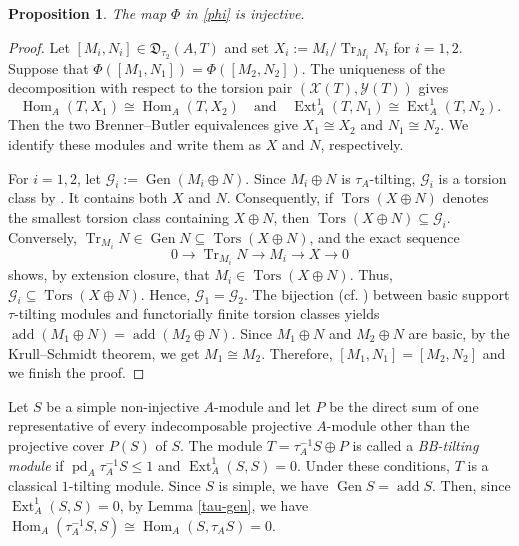 \documentclass[reqno,12pt]{amsart}
\numberwithin{equation}{section}
\theoremstyle{plain}
\newtheorem{proposition}[theorem]{\bf Proposition}
\theoremstyle{definition}
\begin{document}
\begin{proposition}\label{phi-injective}
The map $\Phi$ in \eqref{phi} is injective.
\end{proposition}
\begin{proof}
Let $[M_i,N_i]\in\mathfrak D_{\tau_2}(A,T)$ and set
$X_i:=M_i/\operatorname{Tr}_{M_i}N_i$ for $i=1,2$. Suppose that $\Phi([M_1,N_1])=\Phi([M_2,N_2])$. The uniqueness of the
decomposition with respect to the torsion pair
$(\mathcal X(T),\mathcal Y(T))$ gives
\[
\operatorname{Hom}_A(T,X_1)\cong\operatorname{Hom}_A(T,X_2)
\quad\text{and}\quad
\operatorname{Ext}_A^1(T,N_1)\cong\operatorname{Ext}_A^1(T,N_2).
\]
Then the two Brenner--Butler equivalences give
$X_1\cong X_2$ and $N_1\cong N_2$. We identify these modules and write
them as $X$ and $N$, respectively.

For $i=1,2$, let
$\mathcal G_i:=\operatorname{Gen}(M_i\oplus N)$. Since $M_i\oplus N$ is $\tau_A$-tilting, $\mathcal G_i$ is a torsion
class by \cite[Theorem 2.7]{ADA}. It contains both $X$ and $N$.
Consequently, if $\operatorname{Tors}(X\oplus N)$ denotes the smallest
torsion class containing $X\oplus N$, then
$\operatorname{Tors}(X\oplus N)\subseteq\mathcal G_i$. Conversely,
$\operatorname{Tr}_{M_i}N\in\operatorname{Gen}N
\subseteq\operatorname{Tors}(X\oplus N)$, and the exact sequence
\[
0\longrightarrow\operatorname{Tr}_{M_i}N
\longrightarrow M_i\longrightarrow X\longrightarrow0
\]
shows, by extension closure, that
$M_i\in\operatorname{Tors}(X\oplus N)$. Thus,
$\mathcal G_i\subseteq\operatorname{Tors}(X\oplus N)$. Hence, $\mathcal G_1=\mathcal G_2$. The bijection (cf. \cite[Theorem 2.7]{ADA}) between basic support $\tau$-tilting modules and functorially finite torsion classes
yields
\(
\operatorname{add}(M_1\oplus N)=\operatorname{add}(M_2\oplus N).
\)
Since $M_1\oplus N$ and $M_2\oplus N$ are basic, by the Krull--Schmidt theorem, we get
$M_1\cong M_2$. Therefore, $[M_1,N_1]=[M_2,N_2]$ and we finish the proof.
\end{proof}

Let $S$ be a simple non-injective $A$-module and let $P$ be the direct
sum of one representative of every indecomposable projective
$A$-module other than the projective cover $P(S)$ of $S$. The module
$T=\tau_A^{-1}S\oplus P$ is called a \emph{BB-tilting module} if
\(
\operatorname{pd}_A\tau_A^{-1}S\leq1\)
 and
\(\operatorname{Ext}_A^1(S,S)=0.
\)
Under these conditions, $T$ is a classical $1$-tilting module. Since $S$ is simple, we have
$\operatorname{Gen}S=\operatorname{add}S$. Then, since
$\operatorname{Ext}_A^1(S,S)=0$, by Lemma \ref{tau-gen}, we have
$\operatorname{Hom}_A(\tau_A^{-1}S,S)\cong\operatorname{Hom}_A(S,\tau_AS)=0$.
\end{document}
